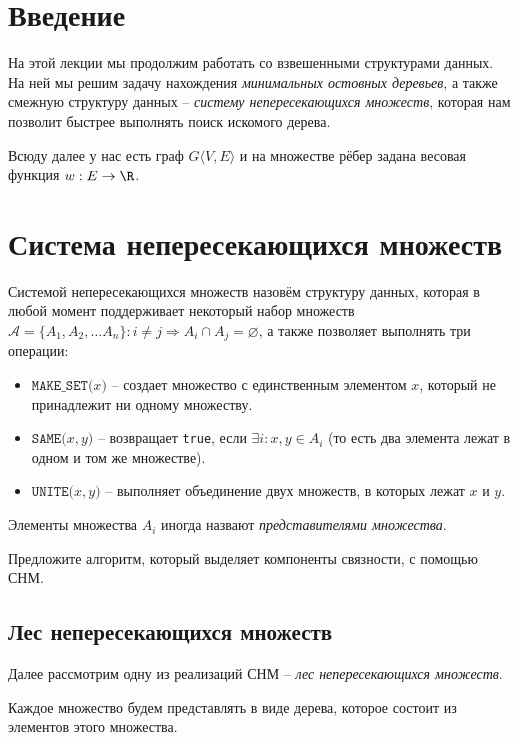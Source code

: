 \section{Введение}

На этой лекции мы продолжим работать со взвешенными структурами данных.
На ней мы решим задачу нахождения \textit{минимальных остовных деревьев}, а также смежную структуру данных -- \textit{систему непересекающихся множеств}, которая нам позволит быстрее выполнять поиск искомого дерева.

Всюду далее у нас есть граф $G\langle V, E \rangle$ и на множестве рёбер задана весовая функция $w: E \to \R$.

\section{Система непересекающихся множеств}

\Def Системой непересекающихся множеств назовём структуру данных, которая в любой момент поддерживает некоторый набор множеств $\mathcal{A} = \{A_1, A_2, \dots A_n\}: i \neq j \Rightarrow A_i \cap A_j = \varnothing$, а также позволяет выполнять три операции:
\begin{itemize}
    \item $\texttt{MAKE\_SET(}x\texttt{)}$ -- создает множество с единственным элементом $x$, который не принадлежит ни одному множеству.
    \item $\texttt{SAME(}x, y\texttt{)}$ -- возвращает \texttt{true}, если $\exists i: x, y \in A_i$ (то есть два элемента лежат в одном и том же множестве).
    \item $\texttt{UNITE(}x, y\texttt{)}$ -- выполняет объединение двух множеств, в которых лежат $x$ и $y$.
\end{itemize}
Элементы множества $A_i$ иногда назвают \textit{представителями множества}.

\Exe Предложите алгоритм, который выделяет компоненты связности, с помощью СНМ.

\subsection{Лес непересекающихся множеств}

Далее рассмотрим одну из реализаций СНМ -- \textit{лес непересекающихся множеств}.

Каждое множество будем представлять в виде дерева, которое состоит из элементов этого множества.

